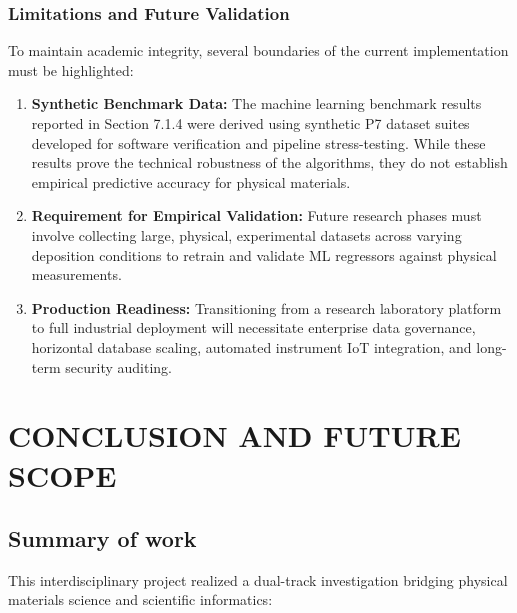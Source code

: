 \documentclass[12pt,a4paper,oneside]{report}
\begin{document}
{{{\subsection{Limitations and Future Validation}
To maintain academic integrity, several boundaries of the current implementation must be highlighted:
\begin{enumerate}
    \item \textbf{Synthetic Benchmark Data:} The machine learning benchmark results reported in Section 7.1.4 were derived using synthetic P7 dataset suites developed for software verification and pipeline stress-testing. While these results prove the technical robustness of the algorithms, they do not establish empirical predictive accuracy for physical materials.
    \item \textbf{Requirement for Empirical Validation:} Future research phases must involve collecting large, physical, experimental datasets across varying deposition conditions to retrain and validate ML regressors against physical measurements.
    \item \textbf{Production Readiness:} Transitioning from a research laboratory platform to full industrial deployment will necessitate enterprise data governance, horizontal database scaling, automated instrument IoT integration, and long-term security auditing.
\end{enumerate}


\chapter{CONCLUSION AND FUTURE SCOPE}

\section{Summary of work}

This interdisciplinary project realized a dual-track investigation bridging physical materials science and scientific informatics:

}}}
\end{document}
